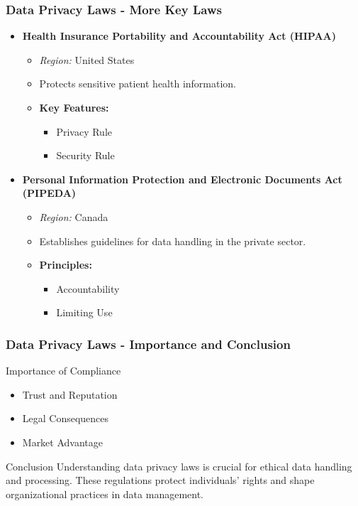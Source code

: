 \documentclass[aspectratio=169]{beamer}
\begin{document}
\begin{frame}[fragile]
    \frametitle{Data Privacy Laws - More Key Laws}
    \begin{itemize}
        \item \textbf{Health Insurance Portability and Accountability Act (HIPAA)}
        \begin{itemize}
            \item \textit{Region:} United States
            \item Protects sensitive patient health information.
            \item \textbf{Key Features:}
            \begin{itemize}
                \item Privacy Rule
                \item Security Rule
            \end{itemize}
        \end{itemize}

        \item \textbf{Personal Information Protection and Electronic Documents Act (PIPEDA)}
        \begin{itemize}
            \item \textit{Region:} Canada
            \item Establishes guidelines for data handling in the private sector.
            \item \textbf{Principles:}
            \begin{itemize}
                \item Accountability
                \item Limiting Use
            \end{itemize}
        \end{itemize}
    \end{itemize}
\end{frame}

\begin{frame}[fragile]
    \frametitle{Data Privacy Laws - Importance and Conclusion}
    \begin{block}{Importance of Compliance}
        \begin{itemize}
            \item Trust and Reputation
            \item Legal Consequences
            \item Market Advantage
        \end{itemize}
    \end{block}

    \begin{block}{Conclusion}
        Understanding data privacy laws is crucial for ethical data handling and processing. These regulations protect individuals' rights and shape organizational practices in data management.
    \end{block}
\end{frame}
\end{document}
